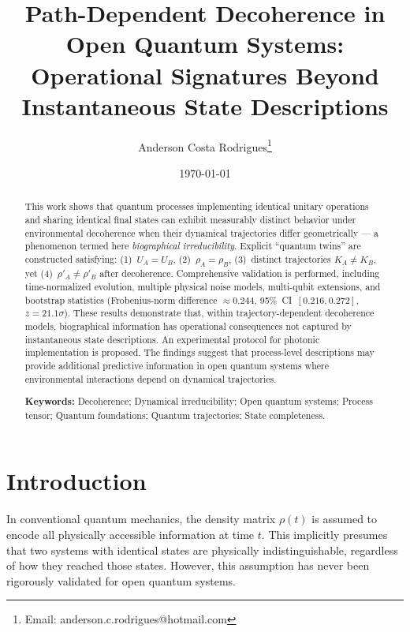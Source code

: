 \documentclass[12pt,a4paper]{article}
\title{\textbf{Path-Dependent Decoherence in Open Quantum Systems:\\
Operational Signatures Beyond Instantaneous State Descriptions}}
\author[1]{Anderson Costa Rodrigues\thanks{Email: anderson.c.rodrigues@hotmail.com}}
\affil[1]{Independent Researcher, Maricá, Rio de Janeiro, Brazil}
\affil[ ]{ORCID: 0009-0001-2084-2593}
\date{\today}
\begin{document}
\maketitle

\begin{abstract}
This work shows that quantum processes implementing identical unitary
operations and sharing identical final states can exhibit measurably
distinct behavior under environmental decoherence when their dynamical
trajectories differ geometrically --- a phenomenon termed here
\emph{biographical irreducibility}. Explicit ``quantum twins'' are constructed satisfying:
(1)~$U_A = U_B$, (2)~$\rho_A = \rho_B$, (3)~distinct trajectories
$K_A \neq K_B$, yet (4)~$\rho'_A \neq \rho'_B$ after decoherence.
Comprehensive validation is performed, including time-normalized evolution,
multiple physical noise models, multi-qubit extensions, and bootstrap
statistics (Frobenius-norm difference $\approx 0.244$,
95\%~CI~$[0.216, 0.272]$, $z = 21.1\sigma$). These results demonstrate
that, within trajectory-dependent decoherence models, biographical
information has operational consequences not captured by instantaneous
state descriptions. An experimental protocol for photonic implementation
is proposed. The findings suggest that process-level descriptions may provide
additional predictive information in open quantum systems where
environmental interactions depend on dynamical trajectories.

\vspace{0.5cm}
\noindent\textbf{Keywords:} Decoherence; Dynamical irreducibility;
Open quantum systems; Process tensor; Quantum foundations;
Quantum trajectories; State completeness.
\end{abstract}

\section{Introduction}

In conventional quantum mechanics, the density matrix $\rho(t)$ is assumed
to encode all physically accessible information at time $t$. This implicitly
presumes that two systems with identical states are physically
indistinguishable, regardless of how they reached those states. However,
this assumption has never been rigorously validated for open quantum systems.
\end{document}
